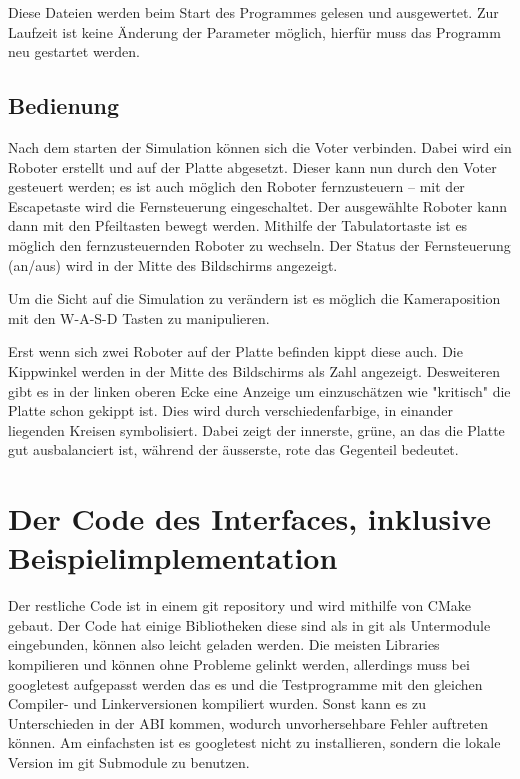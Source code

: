 \documentclass[
    12pt,
    bibliography=totoc,
    ngerman,
    enabledeprecatedfontcommands
]{scrartcl}
\begin{document}
Diese Dateien werden beim Start des Programmes gelesen und ausgewertet. Zur Laufzeit ist keine {\"{A}}nderung der Parameter m{\"{o}}glich, hierf{\"{u}}r muss das Programm
neu gestartet werden.

\subsection{Bedienung}
Nach dem starten der Simulation k{\"{o}}nnen sich die Voter verbinden. Dabei wird ein Roboter erstellt und auf der Platte abgesetzt. Dieser kann nun durch den Voter
gesteuert werden; es ist auch m{\"{o}}glich den Roboter fernzusteuern -- mit der Escapetaste wird die Fernsteuerung eingeschaltet. Der ausgew{\"{a}}hlte Roboter kann
dann mit den Pfeiltasten bewegt werden. Mithilfe der Tabulatortaste ist es m{\"{o}}glich den fernzusteuernden Roboter zu wechseln. Der Status der Fernsteuerung (an/aus)
wird in der Mitte des Bildschirms angezeigt.

Um die Sicht auf die Simulation zu ver{\"{a}}ndern ist es m{\"{o}}glich die Kameraposition mit den W-A-S-D Tasten zu manipulieren.

Erst wenn sich zwei Roboter auf der Platte befinden kippt diese auch. Die Kippwinkel werden in der Mitte des Bildschirms als Zahl angezeigt. Desweiteren gibt es in der
linken oberen Ecke eine Anzeige um einzusch{\"{a}}tzen wie "kritisch" die Platte schon gekippt ist. Dies wird durch verschiedenfarbige, in einander liegenden Kreisen
symbolisiert. Dabei zeigt der innerste, gr{\"{u}}ne, an das die Platte gut ausbalanciert ist, w{\"{a}}hrend der {\"{a}}usserste, rote das Gegenteil bedeutet.


\section{Der Code des Interfaces, inklusive Beispielimplementation}
Der restliche Code ist in einem git repository und wird mithilfe von CMake gebaut. Der Code hat einige Bibliotheken
diese sind als in git als Untermodule eingebunden, k{\"{o}}nnen also leicht geladen werden.
Die meisten Libraries kompilieren und k{\"{o}}nnen ohne Probleme gelinkt werden, allerdings muss bei googletest aufgepasst werden das es und die Testprogramme mit den
gleichen Compiler- und Linkerversionen kompiliert wurden. Sonst kann es zu Unterschieden in der ABI kommen, wodurch unvorhersehbare Fehler auftreten k{\"{o}}nnen. Am einfachsten
ist es googletest nicht zu installieren, sondern die lokale Version im git Submodule zu benutzen.
\end{document}
